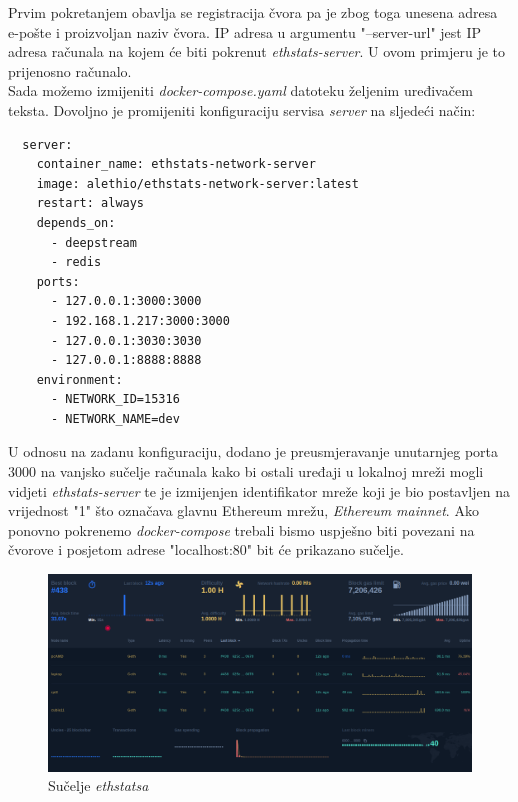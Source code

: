 \documentclass[times, utf8, zavrsni, numeric]{fer}
\begin{document}
Prvim pokretanjem obavlja se registracija čvora pa je zbog toga unesena adresa e-pošte i proizvoljan naziv čvora. IP adresa u argumentu
"--server-url" jest IP adresa računala na kojem će biti pokrenut \emph{ethstats-server}. U ovom primjeru je to prijenosno računalo. \\
Sada možemo izmijeniti \emph{docker-compose.yaml} datoteku željenim uređivačem teksta. Dovoljno je promijeniti konfiguraciju servisa
\emph{server} na sljedeći način:
\begin{lstlisting}
  server:
    container_name: ethstats-network-server
    image: alethio/ethstats-network-server:latest
    restart: always
    depends_on:
      - deepstream
      - redis
    ports:
      - 127.0.0.1:3000:3000
      - 192.168.1.217:3000:3000
      - 127.0.0.1:3030:3030
      - 127.0.0.1:8888:8888
    environment:
      - NETWORK_ID=15316
      - NETWORK_NAME=dev
\end{lstlisting}

U odnosu na zadanu konfiguraciju, dodano je preusmjeravanje unutarnjeg porta 3000 na vanjsko sučelje računala kako bi ostali uređaji
u lokalnoj mreži mogli vidjeti \emph{ethstats-server} te je izmijenjen identifikator mreže koji je bio postavljen na vrijednost "1" što
označava glavnu Ethereum mrežu, \emph{Ethereum mainnet}. Ako ponovno pokrenemo \emph{docker-compose} trebali bismo uspješno biti povezani
na čvorove i posjetom adrese "localhost:80" bit će prikazano sučelje.

\begin{figure}[ht]
  \includegraphics[width=\textwidth]{ethstatsDashboard.png}
  \caption{Sučelje \emph{ethstatsa}}
  \centering
\end{figure}
\end{document}
